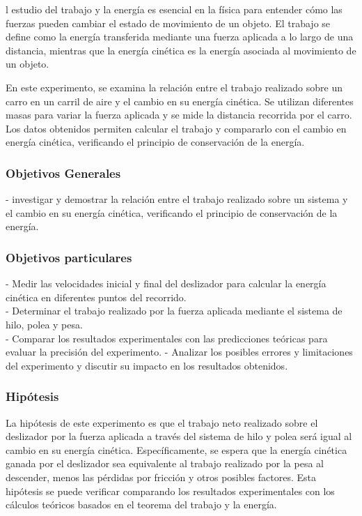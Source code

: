 \documentclass[journal]{IEEEtran}
\begin{document}
l estudio del trabajo y la energía es esencial en la física para entender cómo las fuerzas pueden cambiar el estado de movimiento de un objeto. El trabajo se define como la energía transferida mediante una fuerza aplicada a lo largo de una distancia, mientras que la energía cinética es la energía asociada al movimiento de un objeto.

En este experimento, se examina la relación entre el trabajo realizado sobre un carro en un carril de aire y el cambio en su energía cinética. Se utilizan diferentes masas para variar la fuerza aplicada y se mide la distancia recorrida por el carro. Los datos obtenidos permiten calcular el trabajo y compararlo con el cambio en energía cinética, verificando el principio de conservación de la energía.\\

\subsubsection{Objetivos Generales}

 - investigar y demostrar la relación entre el trabajo realizado sobre un sistema y el cambio en su energía cinética, verificando el principio de conservación de la energía.\\

\subsubsection{Objetivos particulares}
- Medir las velocidades inicial y final del deslizador para calcular la energía cinética en diferentes puntos del recorrido.\\
- Determinar el trabajo realizado por la fuerza aplicada mediante el sistema de hilo, polea y pesa.\\
- Comparar los resultados experimentales con las predicciones teóricas para evaluar la precisión del experimento.
- Analizar los posibles errores y limitaciones del experimento y discutir su impacto en los resultados obtenidos.



\subsubsection{Hipótesis}
La hipótesis de este experimento es que el trabajo neto realizado sobre el deslizador por la fuerza aplicada a través del sistema de hilo y polea será igual al cambio en su energía cinética. Específicamente, se espera que la energía cinética ganada por el deslizador sea equivalente al trabajo realizado por la pesa al descender, menos las pérdidas por fricción y otros posibles factores. Esta hipótesis se puede verificar comparando los resultados experimentales con los cálculos teóricos basados en el teorema del trabajo y la energía.
\\
\end{document}
